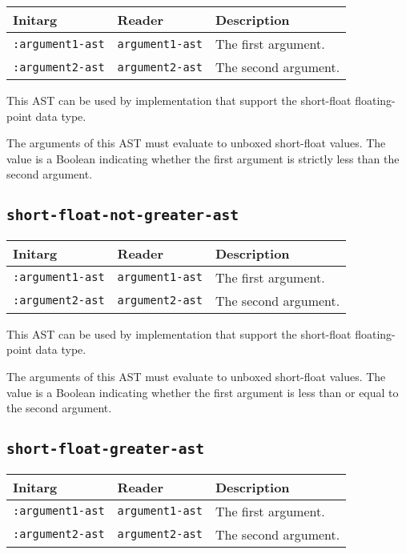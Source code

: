 \begin{tabular}{|l|l|l|}
\hline
Initarg & Reader & Description\\
\hline\hline
\texttt{:argument1-ast} & \texttt{argument1-ast} & The first argument.\\
\hline
\texttt{:argument2-ast} & \texttt{argument2-ast} & The second argument.\\
\hline
\end{tabular}

This AST can be used by implementation that support the short-float
floating-point data type.  

The arguments of this AST must evaluate to unboxed short-float
values.  The value is a Boolean indicating whether the first argument
is strictly less than the second argument.

\subsection{\texttt{short-float-not-greater-ast}}
\label{sec-ast-short-float-not-greater}

\begin{tabular}{|l|l|l|}
\hline
Initarg & Reader & Description\\
\hline\hline
\texttt{:argument1-ast} & \texttt{argument1-ast} & The first argument.\\
\hline
\texttt{:argument2-ast} & \texttt{argument2-ast} & The second argument.\\
\hline
\end{tabular}

This AST can be used by implementation that support the short-float
floating-point data type.  

The arguments of this AST must evaluate to unboxed short-float
values.  The value is a Boolean indicating whether the first argument
is less than or equal to the second argument.

\subsection{\texttt{short-float-greater-ast}}
\label{sec-ast-short-float-greater}

\begin{tabular}{|l|l|l|}
\hline
Initarg & Reader & Description\\
\hline\hline
\texttt{:argument1-ast} & \texttt{argument1-ast} & The first argument.\\
\hline
\texttt{:argument2-ast} & \texttt{argument2-ast} & The second argument.\\
\hline
\end{tabular}

